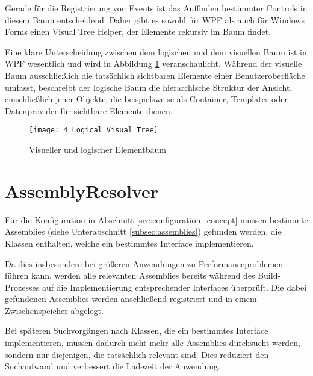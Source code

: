 Gerade für die Registrierung von Events ist das Auffinden bestimmter Controls in diesem Baum entscheidend. Daher gibt es sowohl für WPF als auch für Windows Forms einen Visual Tree Helper, der Elemente rekursiv im Baum findet.

Eine klare Unterscheidung zwischen dem logischen und dem visuellen Baum ist in WPF \cite{microsoft_trees_in_wpf} wesentlich und wird in Abbildung \ref{fig:logical_visual_tree} veranschaulicht. Während der visuelle Baum ausschließlich die tatsächlich sichtbaren Elemente einer Benutzeroberfläche umfasst, beschreibt der logische Baum die hierarchische Struktur der Ansicht, einschließlich jener Objekte, die beispielsweise als Container, Templates oder Datenprovider für sichtbare Elemente dienen.

\begin{figure}[H]
    \centering
    \texttt{[image: 4\_Logical\_Visual\_Tree]}
    \caption{Visueller und logischer Elementbaum}
    \label{fig:logical_visual_tree}
\end{figure}

\section{AssemblyResolver}
\label{sec:assembly_resolver}
Für die Konfiguration in Abschnitt \ref{sec:configuration_concept} müssen bestimmte Assemblies (siehe Unterabschnitt \ref{subsec:assemblies}) gefunden werden, die Klassen enthalten, welche ein bestimmtes Interface implementieren.

Da dies insbesondere bei größeren Anwendungen zu Performanceproblemen führen kann, werden alle relevanten Assemblies bereits während des Build-Prozesses auf die Implementierung entsprechender Interfaces überprüft. Die dabei gefundenen Assemblies werden anschließend registriert und in einem Zwischenspeicher abgelegt.

Bei späteren Suchvorgängen nach Klassen, die ein bestimmtes Interface implementieren, müssen dadurch nicht mehr alle Assemblies durchsucht werden, sondern nur diejenigen, die tatsächlich relevant sind. Dies reduziert den Suchaufwand und verbessert die Ladezeit der Anwendung.